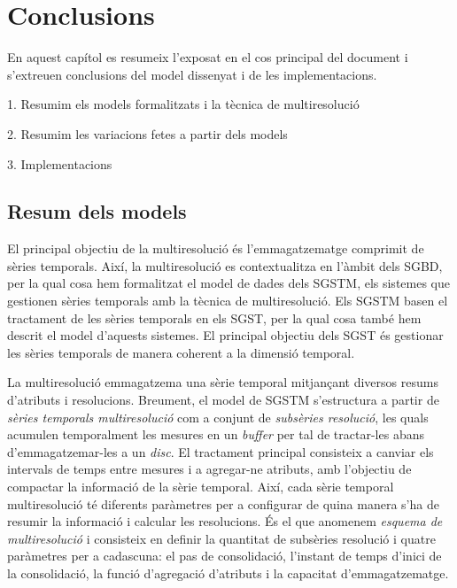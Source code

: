 \chapter{Conclusions}
\label{sec:conclusions}



En aquest capítol es resumeix l'exposat en el cos principal del
document i s'extreuen conclusions del model dissenyat i de les
implementacions.


1. Resumim els models formalitzats i la tècnica de multiresolució

2. Resumim les variacions fetes a partir dels models

3. Implementacions




\section{Resum dels models}


El principal objectiu de la multiresolució és l'emmagatzematge
comprimit de sèries temporals. Així, la multiresolució es
contextualitza en l'àmbit dels \gls{SGBD}, per la qual cosa hem
formalitzat el model de dades dels \gls{SGSTM}, els sistemes que
gestionen sèries temporals amb la tècnica de multiresolució. Els
\gls{SGSTM} basen el tractament de les sèries temporals en els
\gls{SGST}, per la qual cosa també hem descrit el model d'aquests
sistemes. El principal objectiu dels \gls{SGST} és gestionar les
sèries temporals de manera coherent a la dimensió temporal.




La multiresolució emmagatzema una sèrie temporal mitjançant diversos
resums d'atributs i resolucions.  Breument, el model de \gls{SGSTM}
s'estructura a partir de \emph{sèries temporals multiresolució} com a
conjunt de \emph{subsèries resolució}, les quals acumulen temporalment
les mesures en un \emph{buffer} per tal de tractar-les abans
d'emmagatzemar-les a un \emph{disc}. El tractament principal
consisteix a canviar els intervals de temps entre mesures i a
agregar-ne atributs, amb l'objectiu de compactar la informació de la
sèrie temporal.  Així, cada sèrie temporal multiresolució té diferents
paràmetres per a configurar de quina manera s'ha de resumir la
informació i calcular les resolucions. És el que anomenem
\emph{esquema de multiresolució} i consisteix en definir la quantitat
de subsèries resolució i quatre paràmetres per a cadascuna: el pas de
consolidació, l'instant de temps d'inici de la consolidació, la funció
d'agregació d'atributs i la capacitat d'emmagatzematge.



